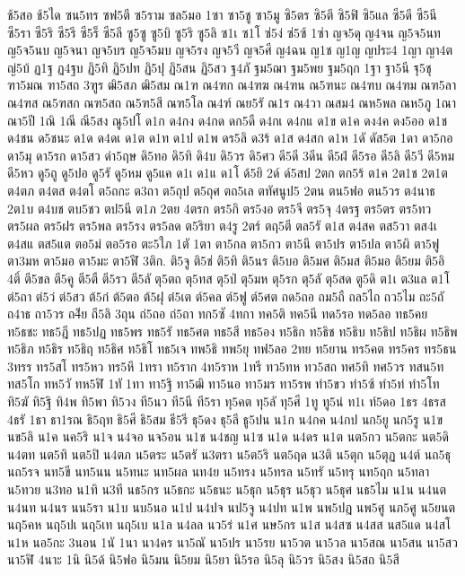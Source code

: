 {ช้5สอ
ช้5ได
ซน5ทร
ซฟ5ตี
ซ5ราม
ซล5มอ
1ซา
ซา5ชู
ซา5มู
ซิ5ตร
ซิ5ตี
ซิ5ฟิ
ซิ5แล
ซี5ดี
ซี5นี
ซี5รา
ซี5ริ
ซี5รี
ซี5ร็
ซี5ลี
ซู5ซู
ซู5บิ
ซู5ริ
ซู5ลิ
ซ1เ
ซ1โ
ซ่5ง่
ซ่5ซ้
1ซ่า
ญจ5ดุ
ญ4จน
ญ5จ5นท
ญ5จ5นบ
ญ5จนา
ญจ5บร
ญ5จ5มบ
ญจ5รง
ญจ5วี
ญจ5ศี
ญ4ฉน
ญ1ช
ญ1ญ
ญประ4
1ญา
ญา4ต
ญ่5บ้
ฏ1ฐ
ฏ4ฐบ
ฏิ5ทิ
ฏิ5ปท
ฏิ5ปุ
ฏิ5สน
ฏิ5สว
ฐ4ภั
ฐม5ฌา
ฐม5พย
ฐม5ฤก
1ฐา
ฐา5นี
ฐุ5ชุ
ฑา5มณ
ฑา5สถ
3ฑูร
ฒิ5สภ
ฒิ5สม
ณ1ฑ
ณ4ฑก
ณ4ฑฆ
ณ4ฑน
ณ5ฑนะ
ณ4ฑบ
ณ4ฑม
ณฑ5ลา
ณ4ฑส
ณ5ฑสก
ณฑ5สถ
ณ5ฑ5สี
ณฑ5โล
ณ4ฑ์
ณย5รั
ณ1ร
ณ4วา
ณสม4
ณห5พล
ณห5ภู
1ณา
ณา5ปี
1ณิ
1ณี
ณี5สง
ณู5ปโ
ด1ก
ด4กง
ด4กด
ดก5ดื
ด4กเ
ด4กแ
ด1ข
ด1ค
ดง4ค
ดง5ออ
ด1ช
ด4ชน
ด5ชนะ
ด1ด
ด4ดเ
ด1ต
ด1ท
ด1ป
ด1พ
ดร5ลิ
ด3ร้
ด1ส
ด4สก
ด1ห
1ดั
ดัส5ต
1ดา
ดา5กอ
ดา5มุ
ดา5รก
ดา5สว
ดำ5ฤษ
ดิ5ทอ
ดิ5ทิ
ดิ4บ
ดิ5วร
ดิ5ศว
ดี5ดี
3ดีน
ดี5ฝ่
ดี5รอ
ดี5ลิ
ดี5วี
ดี5หม
ดี5หว
ดู5ถู
ดู5ปอ
ดู5รั
ดู5หม
ดู5แค
ด1เ
ด1แ
ด1โ
ด้5ยิ
2ด์
ด์5สป
2ตก
ตก5ร้
ต1ค
2ต1ช
2ต1ต
ต4ตภ
ต4ตส
ต4ตโ
ต5ถกะ
ต3ถา
ต5ถุป
ต5ถุศ
ตถ5เล
ตทัศนูป5
2ตน
ตน5ฟอ
ตน5วร
ต4นาธ
2ต1บ
ต4บช
ตบ5ชว
ตป5นี
ต1ภ
2ตย
4ตรก
ตร5กิ
ตร5งอ
ตร5จี
ตร5จุ
4ตรฐ
ตร5ตร
ตร5ทว
ตร5ผล
ตร5ฝร
ตร5พล
ตร5รง
ตร5ลด
ต5ริยา
ต4รู
2ตร์
ตฤ5ตี
ตล5รั
ต1ส
ต4สค
ตส5วา
ตส4เ
ต4สแ
ตส5แต
ตอ5ม่
ตอ5รอ
ตะ5ใภ
1ตั
1ตา
ตา5กล
ตา5กว
ตา5นึ
ตา5ปร
ตา5ปล
ตา5ผิ
ตา5ฟู
ตา3มห
ตา5มอ
ตา5มะ
ตา5ฬี
3ติก.
ติ5จู
ติ5ช่
ติ5ทิ
ติ5นร
ติ5บอ
ติ5มศ
ติ5มส
ติ5มอ
ติ5ยม
ติ5อิ
4ติ์
ตี5ขล
ตี5คู
ตี5ตื
ตี5รว
ตี5ลั
ตุ5ตถ
ตุ5ทส
ตุ5ป่
ตุ5มห
ตุ5รก
ตุ5ลั
ตุ5สด
ตู5ดิ
ต1เ
ต3แล
ต1โ
ต่5ถา
ต่5ว่
ต่5สว
ต้5ก๋
ต้5ตอ
ต้5ฝุ
ต๋5เต
ต์5คล
ต์5ฟู
ต์5ศต
ถด5ถอ
ถม5ถื
ถล5ไถ
ถว5ไม
ถะ5ถั
ถ4าธ
ถา5วร
ถ4ีย
ถี5ลิ
3ถุน
ถ่5ถอ
ถ่5ถา
ทก5ซั
4ทกา
ทค5ติ
ทค5นี
ทด5รอ
ทด5ลอ
ทธ5คย
ท5ธชะ
ทธ5ฎี
ทธ5ปฏ
ทธ5พร
ทธ5รั
ทธ5ศต
ทธ5สี
ทธ5อง
ท5ธิก
ท5ธิช
ท5ธิบ
ท5ธิป
ท5ธิผ
ท5ธิพ
ท5ธิภ
ท5ธิร
ท5ธิฤ
ท5ธิศ
ท5ธิโ
ทธ5เจ
ทพ5ธิ
ทพ5ยุ
ทฟ5ลอ
2ทย
ท5ยาน
ทร5คต
ทร5คร
ทร5ธน
3ทรร
ทร5สโ
ทร5หว
ทร5หึ
1ทรา
ท5ราก
4ท5ราห
1ทรี
ทว5ทห
ทว5สถ
ทศ5ทิ
ทศ5วร
ทสน5ท
ทส5โก
ทห5วั
ทห5ฬิ
1ทั
1ทา
ทา5ฐิ
ทา5ฒิ
ทา5นอ
ทา5มร
ทา5รพ
ทำ5ขว
ทำ5ซ้
ทำ5ท่
ทำ5โท
ทิ5ฆั
ทิ5ฐิ
ทิ4พ
ทิ5พา
ทิ5วง
ที5นว
ที5นี
ที5รา
ทุ5คต
ทุ5ลั
ทุ5ศี
1ทู
ทู5น่
ท1เ
ท์5ดอ
1ธร
4ธรส
4ธรั
1ธา
ธา1รณ
ธิ5ฤท
ธิ5ศี
ธิ5สม
ธี5รี
ธุ5ดง
ธุ5ลี
ธู5ปน
น1ก
น4กค
น4กป
นก5ยู
นก5รู
น1ข
นข5ลิ
น1ค
นค5ริ
น1จ
น4จอ
นจ5อน
น1ช
น4ชญ
น1ซ
น1ด
น4ดร
น1ต
นต5กว
น5ตกะ
นต5ดิ
น4ตท
นต5ทิ
นต5ปิ
น4ตภ
น5ตระ
น5ตรั
น3ตรา
น5ต5ริ
นต5ฤด
น3ติ
น5ตุก
น5ตุฏ
น4ต์
นถ5ธุ
นถ5รจ
นท5ขี
นท5นน
น5ทนะ
นท5ผล
นท4ย
น5ทรง
น5ทรล
น5ทรั
น5ทรุ
นท5ฤก
น5ทลา
น5ทวย
น3ทอ
น1ทิ
น3ที
นธ5กร
น5ธกะ
น5ธนะ
น5ธุก
น5ธุร
น5ธุว
น5ธุศ
นธ5ไม
น1น
น4นต
น4นท
น4นร
นน5รา
น1บ
นบ5นอ
น1ป
น4ปจ
นป5จู
น4ปท
น1พ
นพ5ปฎ
นพ5ศู
นภ5ศู
น5ยนต
นฤ5คห
นฤ5ปเ
นฤ5เท
นฤ5เบ
น1ล
น4ลล
นว5ร่
น1ศ
นษ5กร
น1ส
น4สซ
น4สส
นส5แด
น4สโ
น1ห
นอ5กะ
3นอน
1นั
1นา
นา4คร
นา5ณั
นา5ปร
นา5รย
นา5วต
นา5วล
นา5สณ
นา5สน
นา5สว
นา5ฬิ
4นาะ
1นิ
นิ5ด้
นิ5ฟอ
นิ5มน
นิ5ยม
นิ5ยา
นิ5รอ
นิ5ลุ
นิ5วร
นิ5สง
นิ5สถ
นิ5สี
}
